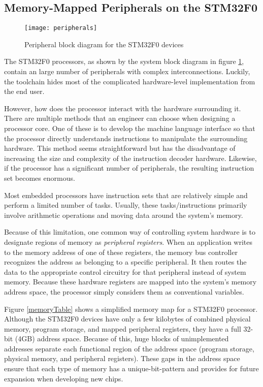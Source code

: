 \documentclass[11pt,fleqn]{book} %
\begin{document}
\subsection{Memory-Mapped Peripherals on the STM32F0}

\begin{figure}[]
    \centering\texttt{[image: peripherals]}
    \caption{Peripheral block diagram for the STM32F0 devices}
    \label{peripherals}
\end{figure}

The STM32F0 processors, as shown by the system block diagram in figure \ref{peripherals}, contain an large number of peripherals with complex interconnections. Luckily, the toolchain hides most of the complicated hardware-level implementation from the end user.

However, how does the processor interact with the hardware surrounding it. There are multiple methods that an engineer can choose when designing a processor core. One of these is to develop the machine language interface so that the processor directly understands instructions to manipulate the surrounding hardware. This method seems straightforward but has the disadvantage of increasing the size and complexity of the instruction decoder hardware. Likewise, if the processor has a significant number of peripherals, the resulting instruction set becomes enormous. 

Most embedded processors have instruction sets that are relatively simple and perform a limited number of tasks. Usually, these tasks/instructions primarily involve arithmetic operations and moving data around the system's memory.

Because of this limitation, one common way of controlling system hardware is to designate regions of memory as \textit{peripheral registers}. When an application writes to the memory address of one of these registers, the memory bus controller recognizes the address as belonging to a specific peripheral. It then routes the data to the appropriate control circuitry for that peripheral instead of system memory. Because these hardware registers are mapped into the system's memory address space, the processor simply considers them as conventional variables. 

Figure \ref{memoryTable} shows a simplified memory map for a STM32F0 processor. Although the STM32F0 devices have only a few kilobytes of combined physical memory, program storage, and mapped peripheral registers, they have a full 32-bit (4GB) address space. Because of this, huge blocks of unimplemented addresses separate each functional region of the address space (program storage, physical memory, and peripheral registers). These gaps in the address space ensure that each type of memory has a unique-bit-pattern and provides for future expansion when developing new chips. 
\end{document}
